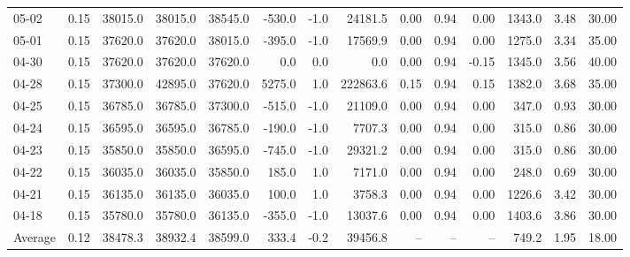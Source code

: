 \begin{threeparttable}
{\begin{tabular}{lrrrrrrrrrrrrr}
  05-02 &     0.15 & 38015.0 & 38015.0 & 38545.0 &     -530.0 &                     -1.0 &             24181.5 &       0.00 &      0.94 &           0.00 &           1343.0 &            3.48 &                  30.00 \\
  05-01 &     0.15 & 37620.0 & 37620.0 & 38015.0 &     -395.0 &                     -1.0 &             17569.9 &       0.00 &      0.94 &           0.00 &           1275.0 &            3.34 &                  35.00 \\
  04-30 &     0.15 & 37620.0 & 37620.0 & 37620.0 &        0.0 &                      0.0 &                 0.0 &       0.00 &      0.94 &          -0.15 &           1345.0 &            3.56 &                  40.00 \\
  04-28 &     0.15 & 37300.0 & 42895.0 & 37620.0 &     5275.0 &                      1.0 &            222863.6 &       0.15 &      0.94 &           0.15 &           1382.0 &            3.68 &                  35.00 \\
  04-25 &     0.15 & 36785.0 & 36785.0 & 37300.0 &     -515.0 &                     -1.0 &             21109.0 &       0.00 &      0.94 &           0.00 &            347.0 &            0.93 &                  30.00 \\
  04-24 &     0.15 & 36595.0 & 36595.0 & 36785.0 &     -190.0 &                     -1.0 &              7707.3 &       0.00 &      0.94 &           0.00 &            315.0 &            0.86 &                  30.00 \\
  04-23 &     0.15 & 35850.0 & 35850.0 & 36595.0 &     -745.0 &                     -1.0 &             29321.2 &       0.00 &      0.94 &           0.00 &            315.0 &            0.86 &                  30.00 \\
  04-22 &     0.15 & 36035.0 & 36035.0 & 35850.0 &      185.0 &                      1.0 &              7171.0 &       0.00 &      0.94 &           0.00 &            248.0 &            0.69 &                  30.00 \\
  04-21 &     0.15 & 36135.0 & 36135.0 & 36035.0 &      100.0 &                      1.0 &              3758.3 &       0.00 &      0.94 &           0.00 &           1226.6 &            3.42 &                  30.00 \\
  04-18 &     0.15 & 35780.0 & 35780.0 & 36135.0 &     -355.0 &                     -1.0 &             13037.6 &       0.00 &      0.94 &           0.00 &           1403.6 &            3.86 &                  30.00 \\
Average &     0.12 & 38478.3 & 38932.4 & 38599.0 &      333.4 &                     -0.2 &             39456.8 &         -- &        -- &             -- &            749.2 &            1.95 &                  18.00 \\

\end{tabular}}
\end{threeparttable}
